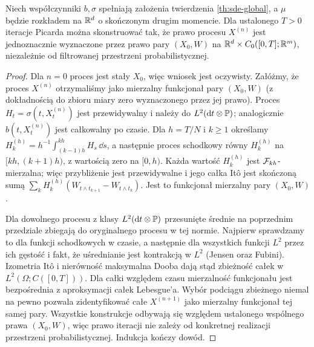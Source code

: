 \begin{lemat}
\label{lem:picard-measurable}
Niech współczynniki $b,\sigma$ spełniają założenia
twierdzenia \ref{th:sde-global}, a $\mu$ będzie rozkładem
na $\mathbb{R}^d$ o skończonym drugim momencie.
Dla ustalonego $T>0$ iteracje Picarda można skonstruować
tak, że prawo procesu $X^{(n)}$ jest jednoznacznie
wyznaczone przez prawo pary $(X_0,W)$ na
$\mathbb{R}^d\times C_0([0,T];\mathbb{R}^m)$, niezależnie od
filtrowanej przestrzeni probabilistycznej.
\end{lemat}
\begin{proof}
Dla $n=0$ proces jest stały $X_0$, więc wniosek jest oczywisty.
Załóżmy, że proces $X^{(n)}$ otrzymaliśmy jako mierzalny
funkcjonał pary $(X_0,W)$ (z dokładnością do zbioru miary
zero wyznaczonego przez jej prawo). Proces
$H_t=\sigma(t,X_t^{(n)})$ jest przewidywalny i należy
do $L^2(\mathrm{d} t\otimes\mathbb{P})$; analogicznie
$b(t,X_t^{(n)})$ jest całkowalny po czasie.
Dla $h=T/N$ i $k\ge1$ określamy
$H_k^{(h)}=h^{-1}\int_{(k-1)h}^{kh}H_s\,\dd s$,
a następnie proces schodkowy równy $H_k^{(h)}$
na $[kh,(k+1)h)$, z wartością zero na $[0,h)$.
Każda wartość $H_k^{(h)}$ jest $\mathcal{F}_{kh}$-mierzalna;
więc przybliżenie jest przewidywalne i jego całka
Itô jest skończoną sumą
$\sum_k H_k^{(h)}(W_{t\wedge t_{k+1}}-W_{t\wedge t_k})$.
Jest to funkcjonał mierzalny pary $(X_0,W)$.

Dla dowolnego procesu z klasy $L^2(\mathrm{d} t\otimes\mathbb{P})$
przesunięte średnie na poprzednim przedziale zbiegają
do oryginalnego procesu w tej normie. Najpierw sprawdzamy
to dla funkcji schodkowych w czasie, a następnie dla
wszystkich funkcji $L^2$ przez ich gęstość i fakt, że
uśrednianie jest kontrakcją w $L^2$ (Jensen oraz Fubini).
Izometria Itô i nierówność maksymalna Dooba dają stąd
zbieżność całek w $L^2(\Omega;C([0,T]))$.
Dla całki względem czasu mierzalność funkcjonału
jest bezpośrednia z aproksymacji całek Lebesgue'a.
Wybór podciągu zbieżnego niemal na pewno pozwala
zidentyfikować całe $X^{(n+1)}$ jako mierzalny
funkcjonał tej samej pary. Wszystkie konstrukcje
odbywają się względem ustalonego wspólnego prawa
$(X_0,W)$, więc prawo iteracji nie zależy od
konkretnej realizacji przestrzeni probabilistycznej.
Indukcja kończy dowód.
\end{proof}

